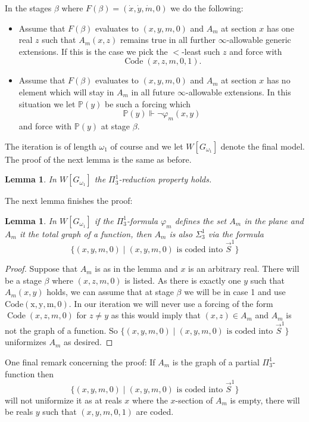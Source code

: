 \documentclass[a4paper,11pt]{article}
\newtheorem{lemma}[theorem]{Lemma}
\newcommand{\forceP}{\mathbb{P}}
\begin{document}
In the stages $\beta$ where $F(\beta) = (\dot{x},\dot{y},\dot{m},0)$ we do the following:
\begin{itemize}
    \item Assume that $F(\beta)$ evaluates to $(x,y,m,0)$ and $A_m$ at section $x$ has one real $z$ such that $A_m (x,z)$ remains true in all further $\infty$-allowable generic extensions. 
    If this is the case we pick the $<$-least such $z$ and force with
    \[ \operatorname{Code} (x,z,m,0,1).\]
    \item Assume that $F(\beta)$ evaluates to $(x,y,m,0)$ and $A_m$ at section $x$ has no element which will stay in $A_m$ in all future $\infty$-allowable extensions. In this situation we let $\forceP(y)$ be such a forcing which 
    \[ \forceP(y) \Vdash \lnot \varphi_m (x,y)\]
    and force with $\forceP(y)$ at stage $\beta$.
\end{itemize}

The iteration is of length $\omega_1$ of course and we let $W[G_{\omega_1}]$ denote the final model. The proof of the next lemma is the same as before.
\begin{lemma}
    In $W[G_{\omega_1}]$ the $\Pi^1_3$-reduction property holds.
\end{lemma}

The next lemma finishes the proof:
\begin{lemma}
    In $W[G_{\omega_1}]$ if the $\Pi^1_3$-formula $\varphi_m$ defines the set $A_m$ in the plane and $A_m$ it the total graph of a function, then $A_m$ is also $\Sigma^1_3$ via the formula
    \[\{ (x,y,m,0) \mid (x,y,m,0) \text{ is coded into } \vec{S}^1\}\]
\end{lemma}
\begin{proof}
 Suppose that $A_m$ is as in the lemma and $x$ is an arbitrary real. There will be a stage $\beta$  where $(x,z,m,0)$ is listed. As there is exactly one $y$ such that $A_m (x,y)$ holds, we can assume that at stage $\beta$ we will be in case 1 and use $\operatorname{Code (x,y,m,0)}$. In our iteration we will never use a forcing of the form $\operatorname{Code} (x,z,m,0)$ for $z \ne y$ as this would imply that $(x,z) \in A_m$ and $A_m$ is not the graph of a function. So
 $\{ (x,y,m,0) \mid (x,y,m,0) \text{ is coded into } \vec{S}^1\}$ uniformizes $A_m$ as desired.
\end{proof}

One final remark concerning the proof: If $A_m$ is the graph of  a partial $\Pi^1_3$-function then  \[\{ (x,y,m,0) \mid (x,y,m,0) \text{ is coded into } \vec{S}^1\}\] will not uniformize it as at reals $x$ where the $x$-section of $A_m$ is empty, there will be reals $y$ such that $(x,y,m,0,1)$ are coded. 
\end{document}
